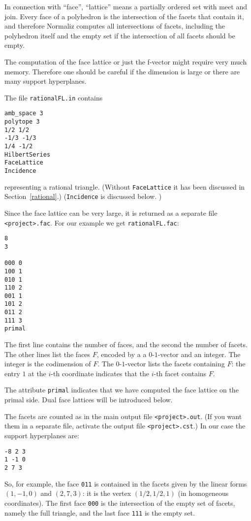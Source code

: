 In connection with ``face'', ``lattice'' means a partially ordered set with meet and join. Every face of a polyhedron is the intersection of the facets that contain it, and therefore Normaliz computes all intersections of facets, including the polyhedron itself and the empty set if the intersection of all facets should be empty.

The computation of the face lattice or just the f-vector might require very much memory. Therefore one should be careful if the dimension is large or there are many support hyperplanes.

The file \verb|rationalFL.in| contains
\begin{Verbatim}
amb_space 3
polytope 3
1/2 1/2
-1/3 -1/3
1/4 -1/2
HilbertSeries
FaceLattice
Incidence
\end{Verbatim}
representing a rational triangle. (Without \verb|FaceLattice| it has been discussed in Section~\ref{rational}.) (\verb|Incidence| is discussed below.
)

Since the face lattice can be very large, it is returned as a separate file \verb|<project>.fac|. For our example we get \verb|rationalFL.fac|:
\begin{Verbatim}
8
3

000 0
100 1
010 1
110 2
001 1
101 2
011 2
111 3
primal
\end{Verbatim}
The first line contains the number of faces, and the second the number of facets. The other lines list the faces $F$, encoded by a a $0$-$1$-vector and an integer. The integer is the codimension of $F$. The $0$-$1$-vector lists the facets containing $F$: the entry $1$ at the $i$-th coordinate indicates that the $i$-th facet contains $F$.

The attribute \verb|primal| indicates that we have computed the face lattice on the primal side. Dual face lattices will be introduced below.

The facets are counted as in the main output file \verb|<project>.out|. (If you want them in a separate file, activate the output file \verb|<project>.cst|.) In our case the support hyperplanes are:
\begin{Verbatim}
-8 2 3 
1 -1 0 
2 7 3
\end{Verbatim}
So, for example, the face \verb|011| is contained in the facets given by the linear forms $(1,-1,0)$ and
$(2,7,3)$: it is the vertex $(1/2,1/2,1)$ (in homogeneous coordinates). The first face \verb|000| is the intersection of the empty set of facets, namely the full triangle, and the last face \verb|111| is the empty set.

